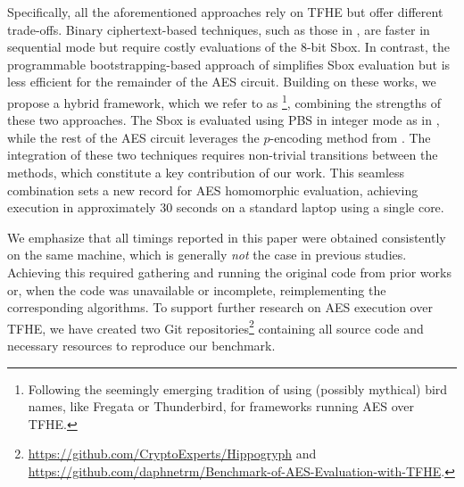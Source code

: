 Specifically, all the aforementioned approaches rely on TFHE but offer different trade-offs. Binary ciphertext-based techniques, such as those in \cite{DBLP:journals/tches/BonPR24}, are faster in sequential mode but require costly evaluations of the 8-bit Sbox. In contrast, the programmable bootstrapping-based approach of \cite{DBLP:conf/wahc/TramaCBS23} simplifies Sbox evaluation but is less efficient for the remainder of the AES circuit.
%
Building on these works, we propose a hybrid framework, which we refer to as \emph{\hippo}\footnote{Following the seemingly emerging tradition of using (possibly mythical) bird names, like Fregata or Thunderbird, for frameworks running AES over TFHE.}, combining the strengths of these two approaches. The Sbox is evaluated using PBS in integer mode as in \cite{DBLP:conf/wahc/TramaCBS23}, while the rest of the AES circuit leverages the $p$-encoding method from \cite{DBLP:journals/tches/BonPR24}. The integration of these two techniques requires non-trivial transitions between the methods, which constitute a key contribution of our work.
This seamless combination sets a new record for AES homomorphic evaluation, achieving execution in approximately 30 seconds on a standard laptop using a single core.

We emphasize that all timings reported in this paper were obtained consistently on the same machine, which is generally \emph{not} the case in previous studies. Achieving this required gathering and running the original code from prior works or, when the code was unavailable or incomplete, reimplementing the corresponding algorithms.
To support further research on AES execution over TFHE, we have created two Git repositories\footnote{\url{https://github.com/CryptoExperts/Hippogryph} and \url{https://github.com/daphnetrm/Benchmark-of-AES-Evaluation-with-TFHE}.} containing all source code and necessary resources to reproduce our benchmark.

